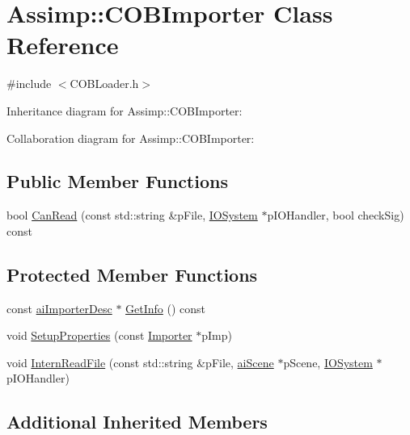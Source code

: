 \hypertarget{class_assimp_1_1_c_o_b_importer}{\section{Assimp\+:\+:C\+O\+B\+Importer Class Reference}
\label{class_assimp_1_1_c_o_b_importer}
}


{\ttfamily \#include $<$C\+O\+B\+Loader.\+h$>$}



Inheritance diagram for Assimp\+:\+:C\+O\+B\+Importer\+:


Collaboration diagram for Assimp\+:\+:C\+O\+B\+Importer\+:
\subsection*{Public Member Functions}
\begin{DoxyCompactItemize}
\item 
bool \hyperlink{class_assimp_1_1_c_o_b_importer_a8c241131434701578dd0610e533327b8}{Can\+Read} (const std\+::string \&p\+File, \hyperlink{class_assimp_1_1_i_o_system}{I\+O\+System} $\ast$p\+I\+O\+Handler, bool check\+Sig) const 
\end{DoxyCompactItemize}
\subsection*{Protected Member Functions}
\begin{DoxyCompactItemize}
\item 
const \hyperlink{structai_importer_desc}{ai\+Importer\+Desc} $\ast$ \hyperlink{class_assimp_1_1_c_o_b_importer_a318bc3ee1d58376254320e3c35cb5628}{Get\+Info} () const 
\item 
void \hyperlink{class_assimp_1_1_c_o_b_importer_ad644da920e9f44f852f1c0e295164952}{Setup\+Properties} (const \hyperlink{class_assimp_1_1_importer}{Importer} $\ast$p\+Imp)
\item 
void \hyperlink{class_assimp_1_1_c_o_b_importer_a24dc861939b2cbfccab4609b937ca2e2}{Intern\+Read\+File} (const std\+::string \&p\+File, \hyperlink{structai_scene}{ai\+Scene} $\ast$p\+Scene, \hyperlink{class_assimp_1_1_i_o_system}{I\+O\+System} $\ast$p\+I\+O\+Handler)
\end{DoxyCompactItemize}
\subsection*{Additional Inherited Members}


